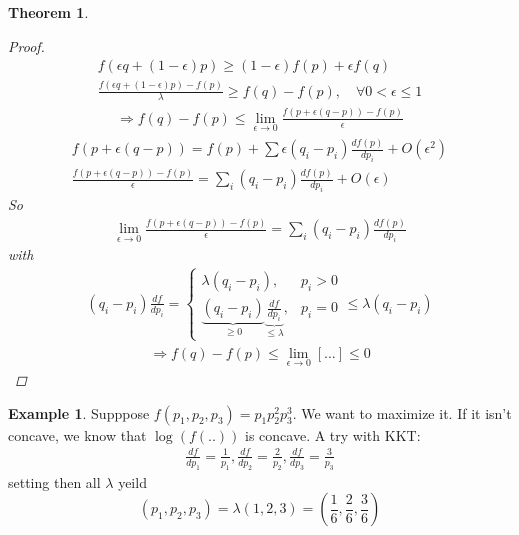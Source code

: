 \documentclass[twoside]{article}
\newtheorem{theorem}{Theorem}[section]
\theoremstyle{definition} %
\newtheorem{example}{Example}
\begin{document}
\begin{appendices}
\begin{theorem}
  \begin{proof}
    \begin{align*}
      f(\epsilon q + (1 - \epsilon)p) \geq (1 - \epsilon) f(p) + \epsilon f(q) \\
      \frac{f(\epsilon q + (1 - \epsilon)p) - f(p)}{\lambda} \geq f(q) - f(p), \quad \forall 0 < \epsilon \leq 1
    \end{align*}
    \begin{align*}
      \Rightarrow f(q) - f(p) \leq \lim_{\epsilon \to 0} \frac{f(p + \epsilon(q - p)) - f(p)}{\epsilon}
    \end{align*}
    \begin{align*}
      f(p + \epsilon (q - p)) = f(p) + \sum \epsilon(q_i - p_i) \frac{df(p)}{dp_i} + O(\epsilon^2) \\
      \frac{f(p + \epsilon(q - p)) - f(p)}{\epsilon} = \sum_{i} (q_i - p_i) \frac{d f(p)}{d p_i} + O(\epsilon)
    \end{align*}
    So
    \begin{align*}
      \lim_{\epsilon \to 0} \frac{f(p + \epsilon(q - p)) - f(p)}{\epsilon} = \sum_i (q_i - p_i) \frac{d f(p)}{d p_i}
    \end{align*}
    with
    \begin{align*}
      (q_i - p_i) \frac{df}{dp_i} =
      \left\{
      \begin{array}{ll}
        \lambda (q_i - p_i), & p_i > 0 \\
        \underbrace{(q_i - p_i)}_{\geq 0} \underbrace{\frac{df}{dp_i}}_{\leq \lambda}, & p_i = 0
      \end{array}
      \right.
      \leq \lambda (q_i - p_i)
    \end{align*}
    \begin{align*}
      \Rightarrow f(q) - f(p) \leq \lim_{\epsilon \to 0} [...] \leq 0
    \end{align*}
  \end{proof}
\end{theorem}

\begin{example}
  Supppose $f(p_1, p_2, p_3) = p_1 p_2^2 p_3^3$.
  We want to maximize it. If it isn't concave, we know that $\log(f(..))$ is concave. A try with KKT:
  \begin{align*}
    \frac{df}{dp_1} = \frac{1}{p_1}, \frac{df}{dp_2} = \frac{2}{p_2}, \frac{df}{dp_3} = \frac{3}{p_3}
  \end{align*}
  setting then all $\lambda$ yeild
  \[ (p_1, p_2, p_3) = \lambda (1, 2, 3) = ( \frac{1}{6}, \frac{2}{6}, \frac{3}{6}) \]
\end{example}


\end{appendices}
\end{document}

